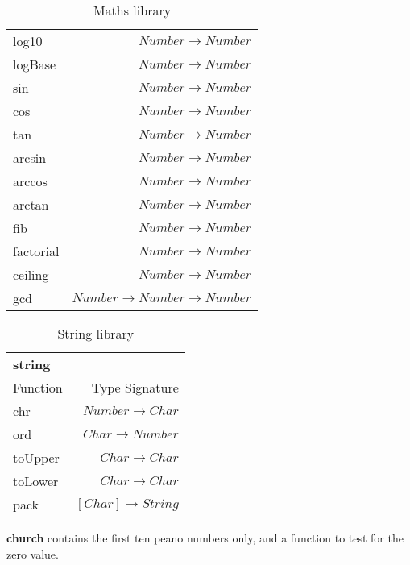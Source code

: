 \begin{table}
\begin{tabular}{l r}
        log10 & $Number \rightarrow Number$ \\
        logBase & $Number \rightarrow Number$ \\
        sin & $Number \rightarrow Number$ \\
        cos & $Number \rightarrow Number$ \\
        tan & $Number \rightarrow Number$ \\
        arcsin & $Number \rightarrow Number$ \\
        arccos & $Number \rightarrow Number$ \\
        arctan & $Number \rightarrow Number$ \\
        fib & $Number \rightarrow Number$ \\
        factorial & $Number \rightarrow Number$ \\
        ceiling & $Number \rightarrow Number$ \\
        gcd & $Number \rightarrow Number \rightarrow Number$ \\
    \end{tabular}
    \caption{Maths library}
\label{table:maths}
\end{table}

\begin{table}[H]
    \begin{tabular}{l r}
    \rowcolor{light-gray}
        \textbf{string} & \\
        Function & Type Signature \\
        \hline
        chr & $Number \rightarrow Char$ \\
        ord & $Char \rightarrow Number$ \\
        toUpper & $Char \rightarrow Char$ \\
        toLower & $Char \rightarrow Char$ \\
        pack & $[Char] \rightarrow String$ \\
    \end{tabular}
    \caption{String library}
\label{table:string}
\end{table}
\textbf{church} contains the first ten peano numbers only, and a function to test for the zero
value.
